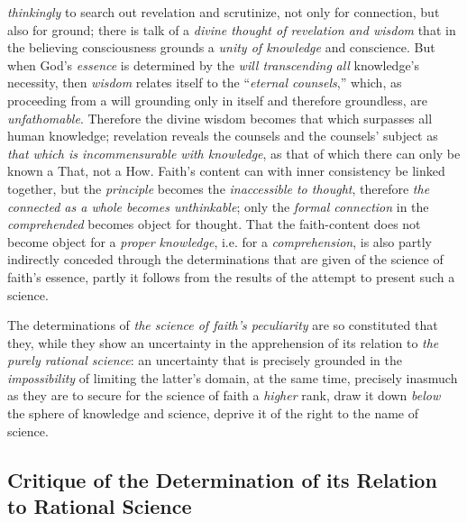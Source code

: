 \documentclass[12pt,a4paper]{book}
\begin{document}
\emph{thinkingly} to search out revelation and scrutinize, not only for connection, but also
for ground; there is talk of a \emph{divine thought of revelation and wisdom} that in the
believing consciousness grounds a \emph{unity of knowledge} and conscience. But when God's \emph{essence} is
determined by the \emph{will transcending} \emph{all} knowledge's necessity, then \emph{wisdom} relates
itself to the ``\emph{eternal counsels},'' which, as proceeding from a will grounding only in itself
and therefore groundless, are \emph{unfathomable}. Therefore the divine wisdom becomes that which
surpasses all human knowledge; revelation reveals the counsels and the counsels' subject as \emph{that
which is incommensurable with knowledge}, as that of which there can only be known a That,
not a How. Faith's content can with inner consistency be linked together, but the \emph{principle}
becomes the \emph{inaccessible to thought}, therefore \emph{the connected as a whole becomes
unthinkable}; only the \emph{formal connection} in the \emph{comprehended} becomes object for thought.
That the faith-content does not become object for a \emph{proper knowledge}, i.e. for a
\emph{comprehension}, is also partly indirectly conceded through the determinations that are given of
the science of faith's essence, partly it follows from the results of the attempt to present
such a science.

The determinations of \emph{the science of faith's peculiarity} are so constituted that they,
while they show an uncertainty in the apprehension of its relation to \emph{the purely rational
science}: an uncertainty that is precisely grounded in the \emph{impossibility} of limiting the
latter's domain, at the same time, precisely inasmuch as they are to secure for the science of
faith a \emph{higher} rank, draw it down \emph{below} the sphere of knowledge and science, deprive it of
the right to the name of science.

\subsection{Critique of the Determination of its Relation to
  Rational Science}
\label{ssec:rational-science}
\end{document}
